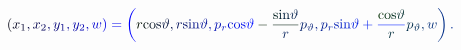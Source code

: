\documentclass[12pt]{article}
\begin{document}
\makeatletter
\renewcommand*{\@textcolor}[3]{%
  \protect\leavevmode
  \begingroup
    \color#1{#2}#3%
  \endgroup
}
\makeatother
\begin{displaymath}
\mathcolor[RGB]{0,0,15}{(} \mathcolor[RGB]{0,0,30}{x} _ { \mathcolor[RGB]{0,0,45}{1} } \mathcolor[RGB]{0,0,60}{,} \mathcolor[RGB]{0,0,75}{x} _ { \mathcolor[RGB]{0,0,90}{2} } \mathcolor[RGB]{0,0,105}{,} \mathcolor[RGB]{0,0,120}{y} _ { \mathcolor[RGB]{0,0,135}{1} } \mathcolor[RGB]{0,0,150}{,} \mathcolor[RGB]{0,0,165}{y} _ { \mathcolor[RGB]{0,0,180}{2} } \mathcolor[RGB]{0,0,195}{,} \mathcolor[RGB]{0,0,210}{w} \mathcolor[RGB]{0,0,225}{)} \mathcolor[RGB]{0,0,240}{=} \mathcolor[RGB]{0,0,255}{\left(} \mathcolor[RGB]{0,15,0}{r} \mathrm { \mathcolor[RGB]{0,15,15}{c} \mathcolor[RGB]{0,15,30}{o} \mathcolor[RGB]{0,15,45}{s} } \mathcolor[RGB]{0,15,60}{\vartheta} \mathcolor[RGB]{0,15,75}{,} \mathcolor[RGB]{0,15,90}{r} \mathrm { \mathcolor[RGB]{0,15,105}{s} \mathcolor[RGB]{0,15,120}{i} \mathcolor[RGB]{0,15,135}{n} } \mathcolor[RGB]{0,15,150}{\vartheta} \mathcolor[RGB]{0,15,165}{,} \mathcolor[RGB]{0,15,180}{p} _ { \mathcolor[RGB]{0,15,195}{r} } \mathrm { \mathcolor[RGB]{0,15,210}{c} \mathcolor[RGB]{0,15,225}{o} \mathcolor[RGB]{0,15,240}{s} } \mathcolor[RGB]{0,15,255}{\vartheta} \mathcolor[RGB]{0,30,0}{-} \mathcolor[RGB]{0,30,15}{\frac { \mathrm { \mathcolor[RGB]{0,30,30}{s} \mathcolor[RGB]{0,30,45}{i} \mathcolor[RGB]{0,30,60}{n} } \mathcolor[RGB]{0,30,75}{\vartheta} } { \mathcolor[RGB]{0,30,90}{r} } } \mathcolor[RGB]{0,30,105}{p} _ { \mathcolor[RGB]{0,30,120}{\vartheta} } \mathcolor[RGB]{0,30,135}{,} \mathcolor[RGB]{0,30,150}{p} _ { \mathcolor[RGB]{0,30,165}{r} } \mathrm { \mathcolor[RGB]{0,30,180}{s} \mathcolor[RGB]{0,30,195}{i} \mathcolor[RGB]{0,30,210}{n} } \mathcolor[RGB]{0,30,225}{\vartheta} \mathcolor[RGB]{0,30,240}{+} \mathcolor[RGB]{0,30,255}{\frac { \mathrm { \mathcolor[RGB]{0,45,0}{c} \mathcolor[RGB]{0,45,15}{o} \mathcolor[RGB]{0,45,30}{s} } \mathcolor[RGB]{0,45,45}{\vartheta} } { \mathcolor[RGB]{0,45,60}{r} } } \mathcolor[RGB]{0,45,75}{p} _ { \mathcolor[RGB]{0,45,90}{\vartheta} } \mathcolor[RGB]{0,45,105}{,} \mathcolor[RGB]{0,45,120}{w} \mathcolor[RGB]{0,45,135}{\right)} \mathcolor[RGB]{0,45,150}{.}
\end{displaymath}
\end{document}
